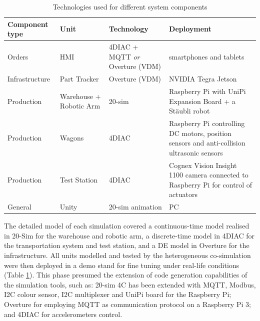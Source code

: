 \begin{table}[ht]
	\centering
		\begin{tabular}{|p{2.4cm}|p{1.8cm}|p{3.2cm}|p{4cm}|}\hline
			\textbf{Component type} & \textbf{Unit} & \textbf{Technology} & \textbf{Deployment}\\
			\hline\hline
			Orders & HMI & 4DIAC + MQTT \textit{or} Overture (VDM) & smartphones and tablets \\ \hline
			Infrastructure & Part Tracker & Overture (VDM) & NVIDIA Tegra Jetson\\ \hline
			Production & Warehouse + Robotic Arm & 20-sim & Raspberry Pi with UniPi Expansion Board + a Stäubli robot\\ \hline
			Production & Wagons & 4DIAC & Raspberry Pi controlling DC motors, position sensors and anti-collision ultrasonic sensors \\ \hline
			Production & Test Station & 4DIAC & Cognex Vision Insight 1100 camera connected to Raspberry Pi for control of actuators\\ \hline
			General & Unity & 20-sim animation & PC\\\hline
		\end{tabular}
	\caption{Technologies used for different system components}
	\label{tab:iPP4CPPS_technologies}
\end{table}

The detailed model of each simulation covered a continuous-time model realised in 20-Sim for the warehouse and robotic arm, a discrete-time model in 4DIAC for the transportation system and test station, and a DE model in Overture for the infrastructure. All units modelled and tested by the heterogeneous co-simulation were then deployed in a demo stand for fine tuning under real-life conditions (Table \ref{tab:iPP4CPPS_technologies}). This phase presumed the extension of code generation capabilities of the simulation tools, such as: 20-sim 4C has been extended with MQTT, Modbus, I2C colour sensor, I2C multiplexer and UniPi board for the Raspberry Pi; Overture for employing MQTT as communication protocol on a Raspberry Pi 3; and 4DIAC for accelerometers control.


